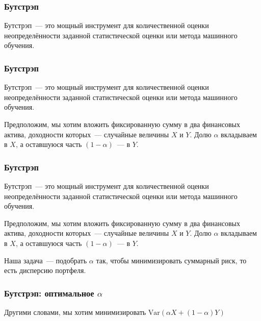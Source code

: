 \documentclass{beamer}
\begin{document}

\begin{frame}
  \frametitle{Бутстрэп}

  Бутстрэп~--- это мощный инструмент для количественной оценки неопределённости заданной статистической оценки или метода машинного обучения.

\end{frame}

\begin{frame}
  \frametitle{Бутстрэп}

  Бутстрэп~--- это мощный инструмент для количественной оценки неопределённости заданной статистической оценки или метода машинного обучения.

  \vspace{0.3cm}

  Предположим, мы хотим вложить фиксированную сумму в два финансовых актива, доходности которых~--- случайные величины $X$ и $Y$. Долю $\alpha$ вкладываем в $X$, а оставшуюся часть $(1 - \alpha)$~--- в $Y$.

\end{frame}

\begin{frame}
  \frametitle{Бутстрэп}

  Бутстрэп~--- это мощный инструмент для количественной оценки неопределённости заданной статистической оценки или метода машинного обучения.

  \vspace{0.3cm}

  Предположим, мы хотим вложить фиксированную сумму в два финансовых актива, доходности которых~--- случайные величины $X$ и $Y$. Долю $\alpha$ вкладываем в $X$, а оставшуюся часть $(1 - \alpha)$~--- в $Y$.

  \vspace{0.3cm}

  Наша задача~--- подобрать $\alpha$ так, чтобы минимизировать суммарный риск, то есть дисперсию портфеля.

\end{frame}

\begin{frame}
  \frametitle{Бутстрэп: оптимальное $\alpha$}

  Другими словами, мы хотим минимизировать $\text{Var}(\alpha X + (1 - \alpha) Y)$

\end{frame}
\end{document}
